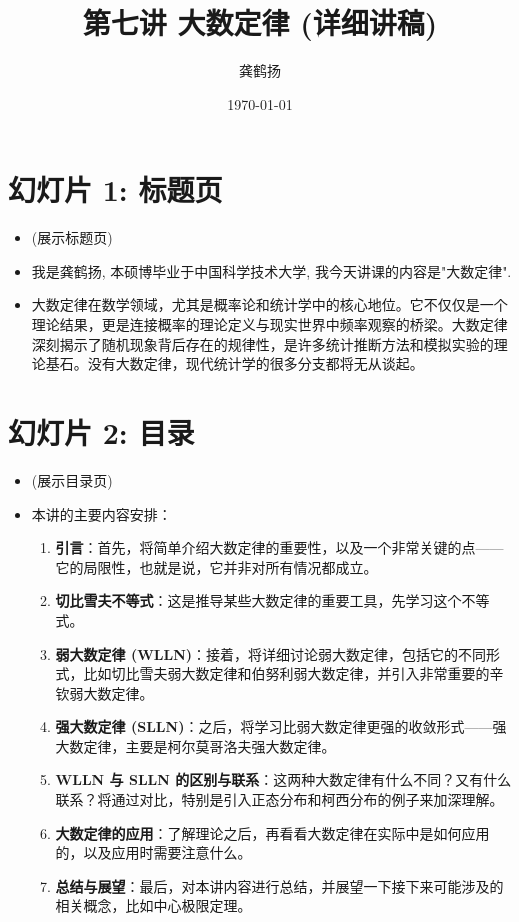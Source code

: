 \documentclass[UTF8]{article} %
\title{第七讲 大数定律 (详细讲稿)}
\author{龚鹤扬}
\date{\today}
\begin{document}
\maketitle
{} %


\section*{幻灯片 1: 标题页}
\begin{itemize}
    \itemsep1em
    \item (展示标题页)
    \item 我是龚鹤扬, 本硕博毕业于中国科学技术大学, 我今天讲课的内容是"大数定律". 
    \item 大数定律在数学领域，尤其是概率论和统计学中的核心地位。它不仅仅是一个理论结果，更是连接概率的理论定义与现实世界中频率观察的桥梁。大数定律深刻揭示了随机现象背后存在的规律性，是许多统计推断方法和模拟实验的理论基石。没有大数定律，现代统计学的很多分支都将无从谈起。
\end{itemize}

\section*{幻灯片 2: 目录}
\begin{itemize}
    \itemsep1em
    \item (展示目录页)
    \item 本讲的主要内容安排：
    \begin{enumerate}[label=\arabic*., itemsep=0.5em]
        \item \textbf{引言}：首先，将简单介绍大数定律的重要性，以及一个非常关键的点——它的局限性，也就是说，它并非对所有情况都成立。
        \item \textbf{切比雪夫不等式}：这是推导某些大数定律的重要工具，先学习这个不等式。
        \item \textbf{弱大数定律 (WLLN)}：接着，将详细讨论弱大数定律，包括它的不同形式，比如切比雪夫弱大数定律和伯努利弱大数定律，并引入非常重要的辛钦弱大数定律。
        \item \textbf{强大数定律 (SLLN)}：之后，将学习比弱大数定律更强的收敛形式——强大数定律，主要是柯尔莫哥洛夫强大数定律。
        \item \textbf{WLLN 与 SLLN 的区别与联系}：这两种大数定律有什么不同？又有什么联系？将通过对比，特别是引入正态分布和柯西分布的例子来加深理解。
        \item \textbf{大数定律的应用}：了解理论之后，再看看大数定律在实际中是如何应用的，以及应用时需要注意什么。
        \item \textbf{总结与展望}：最后，对本讲内容进行总结，并展望一下接下来可能涉及的相关概念，比如中心极限定理。
    \end{enumerate}
\end{itemize}
\end{document}
